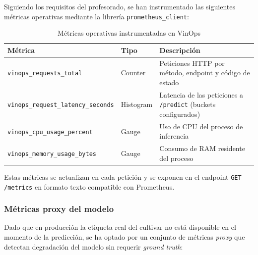 Siguiendo los requisitos del profesorado, se han instrumentado las siguientes métricas operativas mediante la librería \texttt{prometheus\_client}:

\begin{table}[htbp]
\centering
\caption{Métricas operativas instrumentadas en VinOps}
\label{tab:metricas-operativas}
\begin{tabular}{@{}llp{6cm}@{}}
\toprule
\textbf{Métrica} & \textbf{Tipo} & \textbf{Descripción} \\
\midrule
\texttt{vinops\_requests\_total} & Counter & Peticiones HTTP por método, endpoint y código de estado \\
\texttt{vinops\_request\_latency\_seconds} & Histogram & Latencia de las peticiones a \texttt{/predict} (buckets configurados) \\
\texttt{vinops\_cpu\_usage\_percent} & Gauge & Uso de CPU del proceso de inferencia \\
\texttt{vinops\_memory\_usage\_bytes} & Gauge & Consumo de RAM residente del proceso \\
\bottomrule
\end{tabular}
\end{table}

Estas métricas se actualizan en cada petición y se exponen en el endpoint \texttt{GET /metrics} en formato texto compatible con Prometheus.

\subsubsection{Métricas proxy del modelo}

Dado que en producción la etiqueta real del cultivar no está disponible en el momento de la predicción, se ha optado por un conjunto de métricas \textit{proxy} que detectan degradación del modelo sin requerir \textit{ground truth}:

